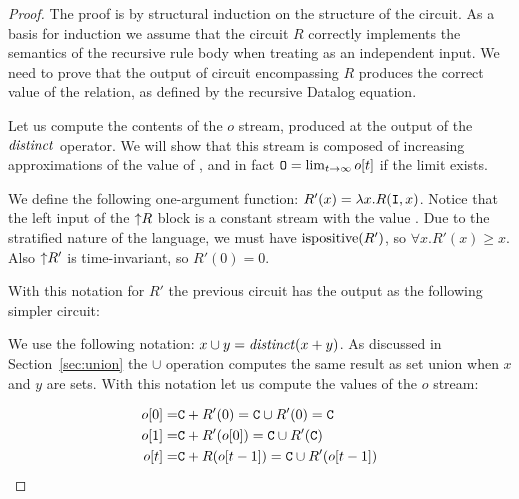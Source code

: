 \begin{proof}
The proof is by structural induction on the structure of the circuit.
As a basis for induction we assume that the circuit $R$ correctly implements
the semantics of the recursive rule body when treating  as an 
independent input.  We need to prove that the output of circuit encompassing
$R$ produces the correct value of the  relation, as defined by
the recursive Datalog equation.

Let us compute the contents of the $o$ stream, produced at the output
of the $\mathit{distinct}$ operator.  We will show that this stream is composed
of increasing approximations of the value of , and in fact
$\mbox{\texttt{O}} = \lim_{t \to \infty} o[t]$ if the limit exists.

We define the following one-argument function: $R'(x) = \lambda x . R(\mbox{\texttt{I}}, x)$.
Notice that the left input of the ${\uparrow}R$ block is a constant stream
with the value .  Due to the stratified nature of the language,
we must have $\mbox{ispositive}(R')$, so $\forall x . R'(x) \geq x$.
Also ${\uparrow}R'$ is time-invariant, so $R'(0) = 0$.

With this notation for $R'$ the previous circuit has the 
output as the following simpler circuit:

\begin{center}
\end{center}

We use the following notation: $x \cup y = \mathit{distinct}(x + y)$.  As discussed in Section~\ref{sec:union}
the $\cup$ operation computes the same result as set union when $x$ and $y$ are sets.
With this notation let us compute the values of the $o$ stream:

$$
\begin{aligned}
o[0] =& \mbox{\texttt{C}} + R'(0) = \mbox{\texttt{C}} \cup R'(0) = \mbox{\texttt{C}} \\
o[1] =& \mbox{\texttt{C}} + R'(o[0]) = \mbox{\texttt{C}} \cup R'(\mbox{\texttt{C}}) \\
o[t] =& \mbox{\texttt{C}} + R(o[t-1]) = \mbox{\texttt{C}} \cup R'(o[t-1]) \\
\end{aligned}
$$ 


\end{proof}
